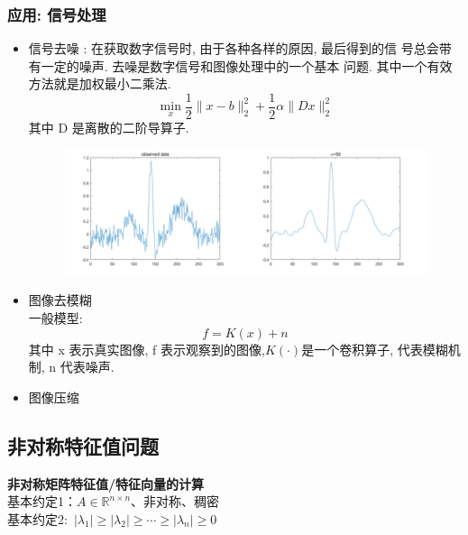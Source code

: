 \documentclass[12pt,a4paper]{article}
\begin{document}
\subsubsection{应用: 信号处理}
\begin{itemize}
	\item 信号去噪 : 在获取数字信号时, 由于各种各样的原因, 最后得到的信 号总会带有一定的噪声. 去噪是数字信号和图像处理中的一个基本 问题. 其中一个有效方法就是加权最小二乘法.
	$$
	\min _{x} \frac{1}{2}\|x-b\|_{2}^{2}+\frac{1}{2} \alpha\|D x\|_{2}^{2}
	$$
	其中 D 是离散的二阶导算子.
	\begin{figure}[htbp]
		\begin{center}
			\includegraphics[scale=1]{figuresl/figure3.png}
		\end{center}
	\end{figure}
	\item 图像去模糊\\
	一般模型:
	$$
	f=K(x)+n
	$$
	其中 x 表示真实图像, f 表示观察到的图像,$K(\cdot)$是一个卷积算子, 代表模糊机制, n 代表噪声.
	\item 图像压缩
\end{itemize}


\subsection{非对称特征值问题}
\noindent \textbf{非对称矩阵特征值/特征向量的计算}\\
基本约定1：$A \in \mathbb{R}^{n \times n}$、非对称、稠密\\
基本约定2:~$\left|\lambda_{1}\right| \geq\left|\lambda_{2}\right| \geq \cdots \geq\left|\lambda_{n}\right| \geq 0$\\
\end{document}
